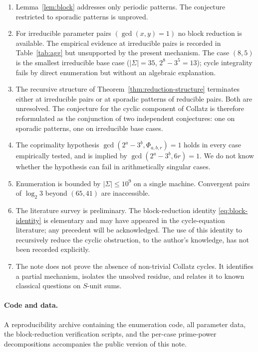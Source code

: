 \documentclass[11pt,a4paper]{article}
\theoremstyle{plain}
\theoremstyle{definition}
\begin{document}
\begin{enumerate}
\item Lemma~\ref{lem:block} addresses only periodic patterns. The
conjecture restricted to sporadic patterns is unproved.

\item For irreducible parameter pairs $(\gcd(x, y) = 1)$ no block
reduction is available. The empirical evidence at irreducible pairs is
recorded in Table~\ref{tab:agg} but unsupported by the present mechanism.
The case $(8, 5)$ is the smallest irreducible base case ($|\Sigma| = 35$,
$2^8 - 3^5 = 13$); cycle integrality fails by direct enumeration but
without an algebraic explanation.

\item The recursive structure of
Theorem~\ref{thm:reduction-structure} terminates either at irreducible
pairs or at sporadic patterns of reducible pairs. Both are unresolved.
The conjecture for the cyclic component of Collatz is therefore
reformulated as the conjunction of two independent conjectures: one on
sporadic patterns, one on irreducible base cases.

\item The coprimality hypothesis
$\gcd(2^a - 3^b, \Phi_{a, b, r}) = 1$ holds in every case empirically
tested, and is implied by $\gcd(2^a - 3^b, 6 r) = 1$. We do not know
whether the hypothesis can fail in arithmetically singular cases.

\item Enumeration is bounded by $|\Sigma| \le 10^9$ on a single machine.
Convergent pairs of $\log_2 3$ beyond $(65, 41)$ are inaccessible.

\item The literature survey is preliminary. The block-reduction
identity \eqref{eq:block-identity} is elementary and may have appeared
in the cycle-equation literature; any precedent will be acknowledged.
The use of this identity to recursively reduce the cyclic obstruction,
to the author's knowledge, has not been recorded explicitly.

\item The note does not prove the absence of non-trivial Collatz cycles.
It identifies a partial mechanism, isolates the unsolved residue, and
relates it to known classical questions on $S$-unit sums.

\end{enumerate}


\paragraph{Code and data.}
A reproducibility archive containing the enumeration code, all parameter
data, the block-reduction verification scripts, and the per-case
prime-power decompositions accompanies the public version of this note.
\end{document}
